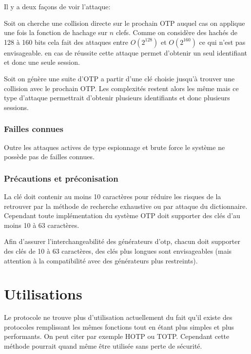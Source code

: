 \documentclass{../res/univ-projet}
\begin{document}
        Il y a deux façons de voir l'attaque: 
        
        Soit on cherche une collision directe sur
    le prochain OTP auquel cas on applique une fois la fonction de hachage sur $n$ clefs.
    Comme on considère des hachés de 128 à 160 bits cela fait des attaques entre $O(2^{128})$
    et $O(2^{160})$ ce qui n'est pas envisageable. en cas de réussite cette attaque permet 
    d'obtenir un seul identifiant et donc une seule session.
    
        Soit on génère une suite d'OTP a partir d'une clé choisie jusqu'à trouver
    une collision avec le prochain OTP. Les complexités restent alors les même mais ce type
    d'attaque permettrait d'obtenir plusieurs identifiants et donc plusieurs sessions.
    
    \subsubsection{Failles connues}
      Outre les attaques actives de type espionnage et brute force le système ne possède pas de failles connues.
    
    \subsubsection{Précautions et préconisation}
    La clé doit contenir au moins 10 caractères pour réduire les risques de la 
retrouver par la méthode de recherche exhaustive ou par attaque du dictionnaire. 
Cependant toute implémentation du système OTP doit supporter des clés d'au 
moins 10 à 63 caractères.

    Afin d'assurer l'interchangeabilité des générateurs d'otp, chacun doit 
supporter des clés de 10 à 63 caractères, des clés plus longues sont 
envisageables (mais attention à la compatibilité avec des générateurs plus 
restreints).
  
\section{Utilisations}
  Le protocole ne trouve plus d'utilisation actuellement du fait qu'il existe des protocoles remplissant
  les mêmes fonctions tout en étant plus simples et plus performants. On peut citer par exemple HOTP ou TOTP. Cependant
  cette méthode pourrait quand même être utilisée sans perte de sécurité.
  
\end{document}
